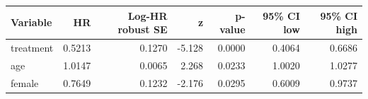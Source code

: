 \begin{tabular}{lrrrrrr}
\hline
Variable & HR & Log-HR robust SE & z & p-value & 95\% CI low & 95\% CI high \\
\hline
treatment &    0.5213 &    0.1270 &    -5.128 &    0.0000 &    0.4064 &    0.6686 \\
age &    1.0147 &    0.0065 &     2.268 &    0.0233 &    1.0020 &    1.0277 \\
female &    0.7649 &    0.1232 &    -2.176 &    0.0295 &    0.6009 &    0.9737 \\
\hline
\end{tabular}
